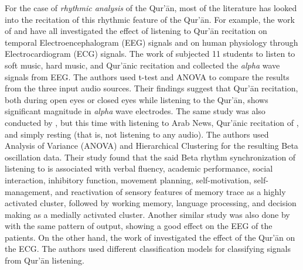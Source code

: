 For the case of \textit{rhythmic analysis} of the Qur'\=an, most of the literature has looked into the recitation of this rhythmic feature of the Qur'\=an. For example, the work of  and  have all investigated the effect of listening to Qur'\=an recitation on temporal Electroencephalogram (EEG) signals and on human physiology through Electrocardiogram (ECG) signals. The work of  subjected 11 students to listen to soft music, hard music, and Qur'\=anic recitation and collected the \textit{alpha} wave signals from EEG. The authors used t-test and ANOVA to compare the results from the three input audio sources. Their findings suggest that Qur'\=an recitation, both during open eyes or closed eyes while listening to the Qur'\=an, shows significant magnitude in \textit{alpha} wave electrodes. The same study was also conducted by , but this time with listening to Arab News, Qur'\=anic recitation of  , and simply resting (that is, not listening to any audio). The authors used Analysis of Variance (ANOVA) and Hierarchical Clustering for the resulting Beta oscillation data. Their study found that the said Beta rhythm synchronization of listening to   is associated with verbal fluency, academic performance, social interaction, inhibitory function, movement planning, self-motivation, self-management, and reactivation of sensory features of memory trace as a highly activated cluster, followed by working memory, language processing, and decision making as a medially activated cluster. Another similar study was also done by  with the same pattern of output, showing a good effect on the EEG of the patients. On the other hand, the work of  investigated the effect of the Qur'\=an on the ECG. The authors used different classification models for classifying signals from Qur'\=an listening. 

